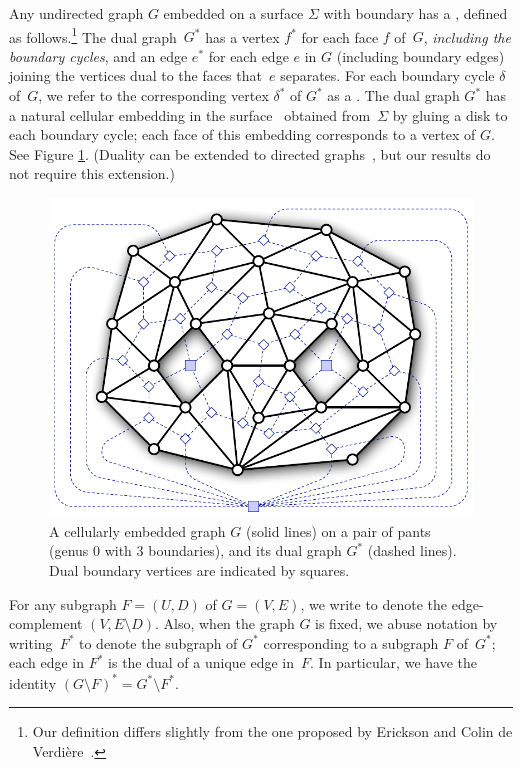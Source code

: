 \documentclass[11pt,twoside]{article}
\begin{document}
Any undirected graph $G$ embedded on a surface $\Sigma$ with boundary has a , defined as follows.\footnote{Our definition differs slightly from the one proposed by Erickson and Colin de Verdière~\cite{ce-tnpcs-10}.}  The dual graph~$G^*$ has a vertex $f^*$ for each face $f$ of~$G$, \emph{including the boundary cycles}, and an edge $e^*$ for each edge $e$ in $G$ (including boundary edges) joining the vertices dual to the faces that~$e$ separates.  For each boundary cycle $\delta$ of~$G$, we refer to the corresponding vertex $\delta^*$ of $G^*$ as a .  The dual graph $G^*$ has a natural cellular embedding in the surface~\EMPH{$\Sigma^\bullet$} obtained from~$\Sigma$ by gluing a disk to each boundary cycle; each face of this embedding corresponds to a vertex of $G$.  See Figure \ref{fig:duality}.  (Duality can be extended to directed graphs~\cite{cen-hfcc-12}, but our results do not require this extension.)

\begin{figure}[htb]
\centering
\includegraphics[scale=0.45]{Fig/pants}
\caption{A cellularly embedded graph $G$ (solid lines) on a pair of pants (genus 0 with 3 boundaries), and its dual graph $G^*$ (dashed lines).  Dual boundary vertices are indicated by squares.}
\label{fig:duality}
\end{figure}
 
For any subgraph $F = (U,D)$ of $G = (V,E)$, we write  to denote the edge-complement $(V, {E\setminus D})$.  Also, when the graph $G$ is fixed, we abuse notation by writing~$F^*$ to denote the subgraph of $G^*$ corresponding to a subgraph $F$ of~$G^*$; each edge in $F^*$ is the dual of a unique edge in~$F$.  In particular, we have the identity $(G\setminus F)^* = G^* \setminus F^*$.
\end{document}

